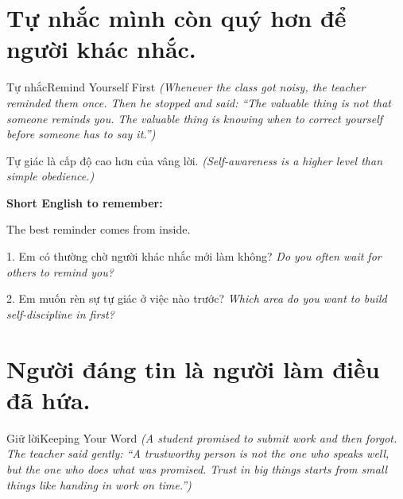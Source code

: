 \section{Tự nhắc mình còn quý hơn để người khác nhắc.}
\begin{truyen}{Tự nhắc}{Remind Yourself First}
\textit{(Whenever the class got noisy, the teacher reminded them once. Then he stopped and said: ``The valuable thing is not that someone reminds you. The valuable thing is knowing when to correct yourself before someone has to say it.'')}
\end{truyen}

\begin{baihoc}
Tự giác là cấp độ cao hơn của vâng lời.
\textit{(Self-awareness is a higher level than simple obedience.)}
\end{baihoc}

\begin{ghinhoanh}
\textbf{Short English to remember:}

The best reminder comes from inside.

\end{ghinhoanh}

\begin{tuhocnhanh}
1. Em có thường chờ người khác nhắc mới làm không? \textit{Do you often wait for others to remind you?}

2. Em muốn rèn sự tự giác ở việc nào trước? \textit{Which area do you want to build self-discipline in first?}
\end{tuhocnhanh}
\ngancach

\section{Người đáng tin là người làm điều đã hứa.}
\begin{truyen}{Giữ lời}{Keeping Your Word}
\textit{(A student promised to submit work and then forgot. The teacher said gently: ``A trustworthy person is not the one who speaks well, but the one who does what was promised. Trust in big things starts from small things like handing in work on time.'')}
\end{truyen}

